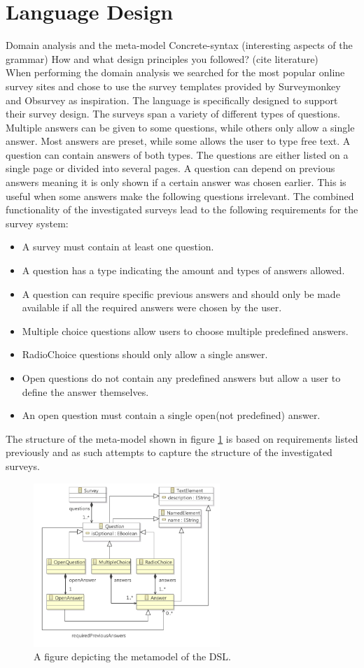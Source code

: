 \documentclass[runningheads]{llncs}
\begin{document}
\section{Language Design}
Domain analysis and the meta-model
Concrete-syntax (interesting aspects of the grammar)
How and what design principles you followed? (cite literature) \\
When performing the domain analysis we searched for the most popular online survey sites and chose to use the survey templates provided by Surveymonkey\cite{surveymonkey} and Obsurvey\cite{obsurvey} as inspiration. The language is specifically designed to support their survey design. The surveys span a variety of different types of questions. Multiple answers can be given to some questions, while others only allow a single answer. Most answers are preset, while some allows the user to type free text. A question can contain answers of both types. The questions are either listed on a single page or divided into several pages. A question can depend on previous answers meaning it is only shown if a certain answer was chosen earlier. This is useful when some answers make the following questions irrelevant. The combined functionality of the investigated surveys lead to the following requirements for the survey system:
\begin{itemize}
\item  A survey must contain at least one question. 
\item A question has a type indicating the amount and types of answers allowed. 
\item A question can require specific previous answers and should only be made available if all the required answers were chosen by the user. 
\item Multiple choice questions allow users to choose multiple predefined answers.
\item RadioChoice questions should only allow a single answer. 
\item Open questions do not contain any predefined answers but allow a user to define the answer themselves. 
\item An open question must contain a single open(not predefined) answer.
\end{itemize}
The structure of the meta-model shown in figure \ref{fig:mmod} is based on requirements listed previously and as such attempts to capture the structure of the investigated surveys. 
\begin{figure}
\centering
\includegraphics[height=6.2cm]{metamodel}
\caption{A figure depicting the metamodel of the DSL.}
\label{fig:mmod}
\end{figure}
\end{document}
